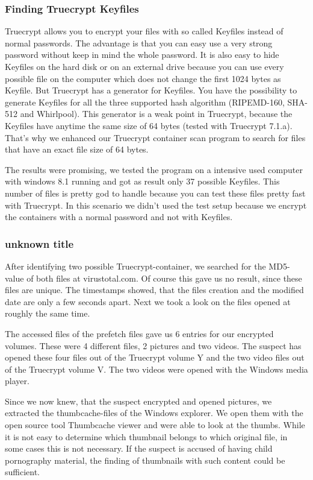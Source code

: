\subsubsection{Finding Truecrypt Keyfiles}
Truecrypt allows you to encrypt your files with so called Keyfiles instead of normal passwords. The advantage is that you can easy use a very strong password without keep in mind the whole password. It is also easy to hide Keyfiles on the hard disk or on an external drive because you can use every possible file on the computer which does not change the first 1024 bytes as Keyfile. But Truecrypt has a generator for Keyfiles. You have the possibility to generate Keyfiles for all the three supported hash algorithm (RIPEMD-160, SHA-512 and Whirlpool). This generator is a weak point in Truecrypt, because the Keyfiles have anytime the same size of 64 bytes (tested with Truecrypt 7.1.a). That's why we enhanced our Truecrypt container scan program to search for files that have an exact file size of 64 bytes.

The results were promising, we tested the program on a intensive used computer with windows 8.1 running and got as result only 37 possible Keyfiles. This number of files is pretty god to handle because you can test these files pretty fast with Truecrypt. In this scenario we didn't used the test setup because we encrypt the containers with a normal password and not with Keyfiles.
\subsubsection{unknown title}
After identifying two possible Truecrypt-container, we searched for the MD5-value of both files at virustotal.com. Of course this gave us no result, since these files are unique. The timestamps showed, that the files creation and the modified date are only a few seconds apart. Next we took a look on the files opened at roughly the same time. 

The accessed files of the prefetch files gave us 6 entries for our encrypted volumes. These were 4 different files, 2 pictures and two videos.
The suspect has opened these four files out of the Truecrypt volume Y and the two video files out of the Truecrypt volume V. The two videos were opened with the Windows media player.

Since we now knew, that the suspect encrypted and opened pictures, we extracted the thumbcache-files of the Windows explorer. We open them with the open source tool Thumbcache viewer and were able to look at the thumbs. While it is not easy to determine which thumbnail belongs to which original file, in some cases this is not necessary. If the suspect is accused of having child pornography material, the finding of thumbnails with such content could be sufficient.


